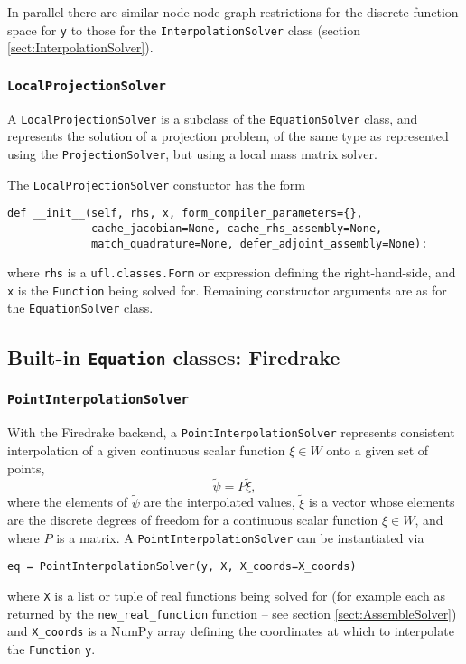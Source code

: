 \documentclass[11pt]{article}
\begin{document}
In parallel there are similar node-node graph restrictions for the discrete
function space for \texttt{y} to those for the \texttt{InterpolationSolver}
class (section \ref{sect:InterpolationSolver}).

\subsubsection{\texttt{LocalProjectionSolver}}

A \texttt{LocalProjectionSolver} is a subclass of the \texttt{EquationSolver}
class, and represents the solution of a projection problem, of the same type as
represented using the \texttt{ProjectionSolver}, but using a local mass matrix
solver.

The \texttt{LocalProjectionSolver} constuctor has the form
\begin{lstlisting}
def __init__(self, rhs, x, form_compiler_parameters={},
             cache_jacobian=None, cache_rhs_assembly=None,
             match_quadrature=None, defer_adjoint_assembly=None):
\end{lstlisting}
where \texttt{rhs} is a \texttt{ufl.classes.Form} or expression defining the
right-hand-side, and \texttt{x} is the \texttt{Function} being solved for.
Remaining constructor arguments are as for the \texttt{EquationSolver} class.

\subsection{Built-in \texttt{Equation} classes: Firedrake}

\subsubsection{\texttt{PointInterpolationSolver}}

With the Firedrake backend, a \texttt{PointInterpolationSolver} represents
consistent interpolation of a given continuous scalar function $\xi \in W$ onto
a given set of points,
\begin{equation*}
  \tilde{\psi} = P \tilde{\xi},
\end{equation*}
where the elements of $\tilde{\psi}$ are the interpolated values, $\tilde{\xi}$
is a vector whose elements are the discrete degrees of freedom for a continuous
scalar function $\xi \in W$, and where $P$ is a matrix. A
\texttt{PointInterpolationSolver} can be instantiated via
\begin{lstlisting}
eq = PointInterpolationSolver(y, X, X_coords=X_coords)
\end{lstlisting}
where \texttt{X} is a list or tuple of real functions being solved for (for
example each as returned by the \texttt{new\_real\_function} function -- see
section \ref{sect:AssembleSolver}) and \texttt{X\_coords} is a NumPy array
defining the coordinates at which to interpolate the \texttt{Function}
\texttt{y}.
\end{document}
